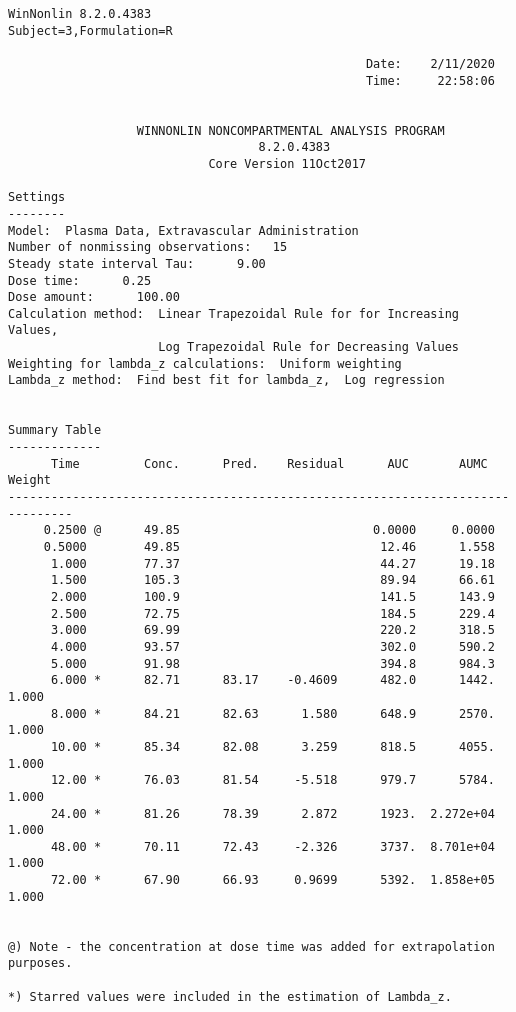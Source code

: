 \documentclass[12pt,a4paper]{article}
\begin{document}
\begin{verbatim}
WinNonlin 8.2.0.4383
Subject=3,Formulation=R

                                                  Date:    2/11/2020
                                                  Time:     22:58:06


                  WINNONLIN NONCOMPARTMENTAL ANALYSIS PROGRAM
                                   8.2.0.4383
                            Core Version 11Oct2017

Settings
--------
Model:  Plasma Data, Extravascular Administration
Number of nonmissing observations:   15
Steady state interval Tau:      9.00
Dose time:      0.25
Dose amount:      100.00
Calculation method:  Linear Trapezoidal Rule for for Increasing Values,
                     Log Trapezoidal Rule for Decreasing Values
Weighting for lambda_z calculations:  Uniform weighting
Lambda_z method:  Find best fit for lambda_z,  Log regression


Summary Table
-------------
      Time         Conc.      Pred.    Residual      AUC       AUMC      Weight
-------------------------------------------------------------------------------
     0.2500 @      49.85                           0.0000     0.0000
     0.5000        49.85                            12.46      1.558
      1.000        77.37                            44.27      19.18
      1.500        105.3                            89.94      66.61
      2.000        100.9                            141.5      143.9
      2.500        72.75                            184.5      229.4
      3.000        69.99                            220.2      318.5
      4.000        93.57                            302.0      590.2
      5.000        91.98                            394.8      984.3
      6.000 *      82.71      83.17    -0.4609      482.0      1442.      1.000
      8.000 *      84.21      82.63      1.580      648.9      2570.      1.000
      10.00 *      85.34      82.08      3.259      818.5      4055.      1.000
      12.00 *      76.03      81.54     -5.518      979.7      5784.      1.000
      24.00 *      81.26      78.39      2.872      1923.  2.272e+04      1.000
      48.00 *      70.11      72.43     -2.326      3737.  8.701e+04      1.000
      72.00 *      67.90      66.93     0.9699      5392.  1.858e+05      1.000


@) Note - the concentration at dose time was added for extrapolation purposes.

*) Starred values were included in the estimation of Lambda_z.



\end{verbatim}
\end{document}
